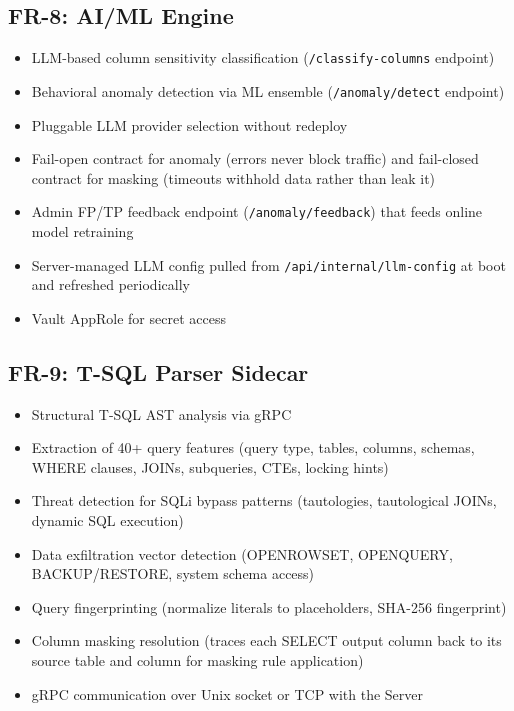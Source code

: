 \subsection{FR-8: AI/ML Engine}
\begin{itemize}
    \item LLM-based column sensitivity classification (\texttt{/classify-columns} endpoint)
    \item Behavioral anomaly detection via ML ensemble (\texttt{/anomaly/detect} endpoint)
    \item Pluggable LLM provider selection without redeploy
    \item Fail-open contract for anomaly (errors never block traffic) and fail-closed contract for masking (timeouts withhold data rather than leak it)
    \item Admin FP/TP feedback endpoint (\texttt{/anomaly/feedback}) that feeds online model retraining
    \item Server-managed LLM config pulled from \texttt{/api/internal/llm-config} at boot and refreshed periodically
    \item Vault AppRole for secret access
\end{itemize}

\subsection{FR-9: T-SQL Parser Sidecar}
\begin{itemize}
    \item Structural T-SQL AST analysis via gRPC
    \item Extraction of 40+ query features (query type, tables, columns, schemas, WHERE clauses, JOINs, subqueries, CTEs, locking hints)
    \item Threat detection for SQLi bypass patterns (tautologies, tautological JOINs, dynamic SQL execution)
    \item Data exfiltration vector detection (OPENROWSET, OPENQUERY, BACKUP/RESTORE, system schema access)
    \item Query fingerprinting (normalize literals to placeholders, SHA-256 fingerprint)
    \item Column masking resolution (traces each SELECT output column back to its source table and column for masking rule application)
    \item gRPC communication over Unix socket or TCP with the Server
\end{itemize}

